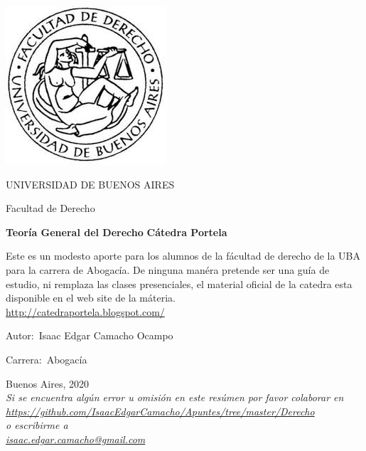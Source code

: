 \documentclass[12pt]{book}
\begin{document}
\thispagestyle{empty}

\begin {center}

\includegraphics[scale=.4]{descarga.jpeg}

\medskip
UNIVERSIDAD DE BUENOS AIRES

Facultad de Derecho


\vspace{3cm}

\textbf{\large Teor\'ia General del Derecho}
\textbf{\large C\'atedra Portela}
\vspace{2cm}


Este es un modesto aporte para los alumnos de la f\'acultad de derecho de la UBA para la carrera de Abogac\'ia.
De ninguna man\'era pretende ser una gu\'ia de estudio, ni remplaza las clases presenciales, el material oficial de la catedra esta disponible en el web site de la m\'ateria.
\\
\url{http://catedraportela.blogspot.com/}

\end {center}


\vspace{2.5cm}

\noindent Autor:\,	Isaac Edgar Camacho Ocampo
 
\noindent Carrera:\,	Abogac\'ia

\vspace{1cm}

\vspace{1cm}

\noindent Buenos Aires, 2020
\vspace{1cm}
\\
\textit{Si se encuentra alg\'un error u omisi\'on en este res\'umen por favor colaborar en \\
\url{https://github.com/IsaacEdgarCamacho/Apuntes/tree/master/Derecho} \quad \\ o escribirme a \\ \url{isaac.edgar.camacho@gmail.com}
}
\newpage
\end{document}
